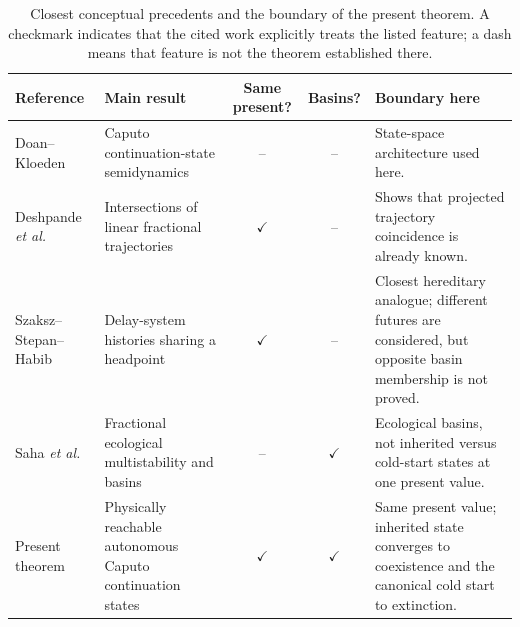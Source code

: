 \begin{table}[t]
\centering
\small
\caption{Closest conceptual precedents and the boundary of the present theorem.  A checkmark indicates that the cited work explicitly treats the listed feature; a dash means that feature is not the theorem established there.}
\label{tab:prior-boundary}
\setlength{\tabcolsep}{3pt}
\begin{tabular}{p{}p{}ccp{}}
\toprule
Reference & Main result & Same present? & Basins? & Boundary here\\
\midrule
Doan--Kloeden
\cite{DoanKloeden2021Semidynamical,DoanKloeden2024Attractors}
&
Caputo continuation-state semidynamics
&
--
&
--
&
State-space architecture used here.\\[1mm]

Deshpande \emph{et al.}
\cite{DeshpandeDaftardarGejjiVellaisamy2019}
&
Intersections of linear fractional trajectories
&
\(\checkmark\)
&
--
&
Shows that projected trajectory coincidence is already known.\\[1mm]

Szaksz--Stepan--Habib
\cite{SzakszStepanHabib2024DynamicalIntegrity}
&
Delay-system histories sharing a headpoint
&
\(\checkmark\)
&
--
&
Closest hereditary analogue; different futures are considered, but opposite basin membership is not proved.\\[1mm]

Saha \emph{et al.}
\cite{SahaEtAl2026AlleeBasin}
&
Fractional ecological multistability and basins
&
--
&
\(\checkmark\)
&
Ecological basins, not inherited versus cold-start states at one present value.\\[1mm]

Present theorem
&
Physically reachable autonomous Caputo continuation states
&
\(\checkmark\)
&
\(\checkmark\)
&
Same present value; inherited state converges to coexistence and the canonical cold start to extinction.\\
\bottomrule
\end{tabular}
\end{table}
